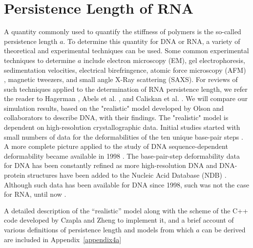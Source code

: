 \section{Persistence Length of RNA}
A quantity commonly used to  quantify the stiffness of polymers is the
so-called persistence  length $a$. To determine this  quantity for DNA
or RNA,  a variety of  theoretical and experimental techniques  can be
used.  Some  common experimental  techniques to determine  $a$ include
electron   microscopy   (EM),   gel   electrophoresis,   sedimentation
velocities, electrical birefringence,  atomic force microscopy (AFM) ,
magnetic  tweezers,  and small  angle  X-Ray  scattering (SAXS).   For
reviews  of  such  techniques  applied  to the  determination  of  RNA
persistence    length,    we   refer    the    reader   to    Hagerman
\cite{hagerman1997}, Abels  et al.  \cite{abels2005},  and Caliskan et
al.   \cite{caliskan2005}.  We  will compare  our  simulation results,
based on  the "realistic" model  developed by Olson  and collaborators
\cite{olson1995} to describe DNA, with their findings. The "realistic"
model is dependent  on high-resolution crystallographic data.  Initial
studies started with small numbers  of data for the deformabilities of
the  ten unique  base-pair  steps \cite{olson1995}.   A more  complete
picture applied  to the study of DNA  sequence-dependent deformability
became  available   in  1998  \cite{olson1998}.    The  base-pair-step
deformability  data  for  DNA  has  been constantly  refined  as  more
high-resolution DNA and DNA-protein  structures have been added to the
Nucleic Acid Database (NDB) \cite{balasubramanian2009}.  Although such
data has been available for DNA  since 1998, such was not the case for
RNA, until now \cite{olson2009}.

A detailed description of the  ``realistic'' model along with the scheme
of the C++  code developed by Czapla and Zheng to  implement it, and a
brief account of various  definitions of persistence length and models
from which $a$ can be derived are included in Appendix~\ref{appendix4a}





